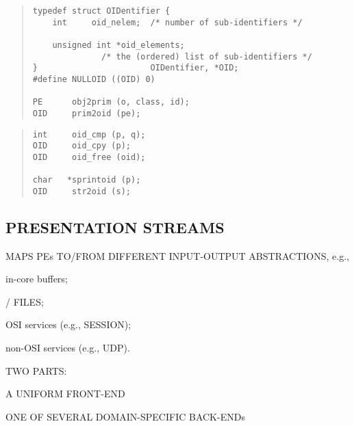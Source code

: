 \begin{bwslide}

\begin{quote}\small\begin{verbatim}
typedef struct OIDentifier {
    int     oid_nelem;  /* number of sub-identifiers */

    unsigned int *oid_elements;
              /* the (ordered) list of sub-identifiers */
}                       OIDentifier, *OID;
#define NULLOID ((OID) 0)

PE      obj2prim (o, class, id);
OID     prim2oid (pe);
\end{verbatim}\end{quote}
\end{bwslide}


\begin{bwslide}

\begin{quote}\small\begin{verbatim}
int     oid_cmp (p, q);
OID     oid_cpy (p);
OID     oid_free (oid);

char   *sprintoid (p);
OID     str2oid (s);
\end{verbatim}\end{quote}
\end{bwslide}


\begin{bwslide}
\part*	{PRESENTATION STREAMS}\bf

\begin{nrtc}
\item	MAPS PEs TO/FROM DIFFERENT INPUT-OUTPUT ABSTRACTIONS, e.g.,
    \begin{nrtc}
    \item	in-core buffers;

    \item	\unix/ FILES;

    \item	OSI services (e.g., SESSION);

    \item	non-OSI services (e.g., UDP).
    \end{nrtc}

\item	TWO PARTS:
    \begin{nrtc}
    \item	A UNIFORM FRONT-END

    \item	ONE OF SEVERAL DOMAIN-SPECIFIC BACK-ENDs
    \end{nrtc}
\end{nrtc}
\end{bwslide}


